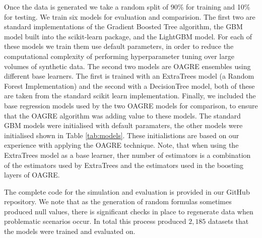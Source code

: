 \documentclass[12pt,a4paper]{article}
\begin{document}
Once the data is generated we take a random split of 90\% for training and 10\% for testing. 
We train six models for evaluation and comparision. The first two are standard implementations of
the Gradient Boosted Tree algorithm, the GBM model built into the scikit-learn package, and
the LightGBM model\cite{Ke2017}. For each of these models we train them use default parameters,
in order to reduce the computational complexity of performing hyperparameter tuning over large volumes of synthetic
data. The second two models are OAGRE ensembles using different base learners. The first is trained with an 
ExtraTrees model (a Random Forest Implementation) and the second with a DecisionTree model, both of these are
taken from the standard scikit learn implementation. Finally, we included the base regression models used
by the two OAGRE models for comparison, to ensure that the OAGRE algorithm was adding value to these models.
The standard GBM models were initialised with default paramaters, the other models were initialised shown in 
Table \ref{tab:models}. These initialistions are based on our experience with applying the OAGRE technique.
Note, that when using the ExtraTrees model as a base learner, ther number of estimators is a combination of
the estimators used by ExtraTrees and the estimators used in the boosting layers of OAGRE.

\begin{table}
\caption{Simulation Parameters}
\label{tab:sim}
\end{table}

The complete code for the simulation and evaluation is provided in our GitHub repository. We note that as the
generation of random formulas sometimes produced null values, there is significant checks in place to regenerate
data when problematic scenarios occur. In total this process produced $2,185$ datasets that the models were
trained and evaluated on.
\end{document}
